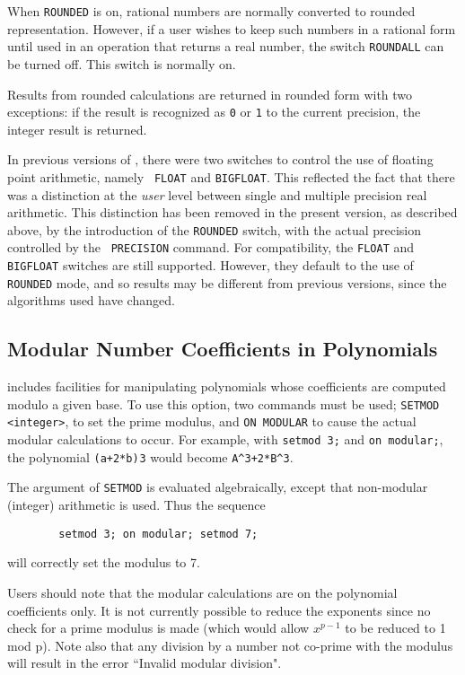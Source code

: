 When {\tt ROUNDED} is on, rational numbers are normally converted to
rounded representation.  However, if a user wishes to keep such numbers in
a rational form until used in an operation that returns a real number,
the switch {\tt ROUNDALL}  can be turned off.  This
switch is normally on.

Results from rounded calculations are returned in rounded form with two
exceptions: if the result is recognized as {\tt 0} or {\tt 1} to the
current precision, the integer result is returned.

\COMPATNOTE In previous versions of {\REDUCE}, there were two
switches to control the use of floating point arithmetic, namely {\tt
FLOAT}  and {\tt BIGFLOAT}.  This reflected
the fact that there was a distinction at the {\em user} level between single
and multiple precision real arithmetic.  This distinction has been removed
in the present version, as described above, by the introduction of the
{\tt ROUNDED} switch, with the actual precision controlled by the {\tt
PRECISION} command.  For compatibility, the {\tt FLOAT} and {\tt BIGFLOAT}
switches are still supported.  However, they default to the use of
{\tt ROUNDED} mode, and so results may be different from previous
versions, since the algorithms used have changed.

\subsection{Modular Number Coefficients in Polynomials}
{\REDUCE} includes facilities for manipulating polynomials whose
coefficients are computed modulo a given base.  To use this option, two
commands must be used; {\tt SETMOD} {\tt <integer>}, to set
the prime modulus, and {\tt ON MODULAR} to cause the
actual modular calculations to occur.
For example, with {\tt setmod 3;} and {\tt on modular;}, the polynomial
{\tt (a+2*b)$^{ }$3} would become {\tt A\^{ }3+2*B\^{ }3}.

The argument of {\tt SETMOD} is evaluated algebraically, except that
non-modular (integer) arithmetic is used.  Thus the sequence
\begin{verbatim}
        setmod 3; on modular; setmod 7;
\end{verbatim}
will correctly set the modulus to 7.

Users should note that the modular calculations are on the polynomial
coefficients only.  It is not currently possible to reduce the exponents
since no check for a prime modulus is made (which would allow
$x^{p-1}$ to be reduced to 1 mod p).  Note also that any division by a
number not co-prime with the modulus will result in the error ``Invalid
modular division".

